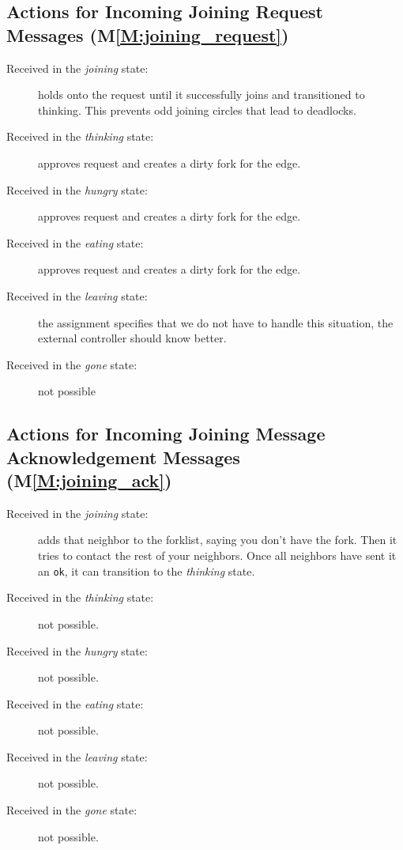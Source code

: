 \documentclass[11pt]{article}
\begin{document}
\subsection{Actions for Incoming Joining Request Messages (M\ref{M:joining_request})}
\begin{description}
\item[Received in the \textit{joining} state:] holds onto the request until it successfully joins and transitioned to thinking. This prevents odd joining circles that lead to deadlocks.
\item[Received in the \textit{thinking} state:] approves request and creates a dirty fork for the edge.
\item[Received in the \textit{hungry} state:] approves request and creates a dirty fork for the edge.
\item[Received in the \textit{eating} state:] approves request and creates a dirty fork for the edge.
\item[Received in the \textit{leaving} state:] the assignment specifies that we do not have to handle this situation, the external controller should know better.
\item[Received in the \textit{gone} state:] not possible
\end{description}

\subsection{Actions for Incoming Joining Message Acknowledgement Messages (M\ref{M:joining_ack})}
\begin{description}
\item[Received in the \textit{joining} state:] adds that neighbor to the forklist, saying you don't have the fork. Then it tries to contact the rest of your neighbors. Once all neighbors have sent it an \texttt{ok}, it can transition to the \emph{thinking} state.
\item[Received in the \textit{thinking} state:] not possible.
\item[Received in the \textit{hungry} state:] not possible.
\item[Received in the \textit{eating} state:] not possible.
\item[Received in the \textit{leaving} state:] not possible.
\item[Received in the \textit{gone} state:] not possible.
\end{description}
\end{document}
